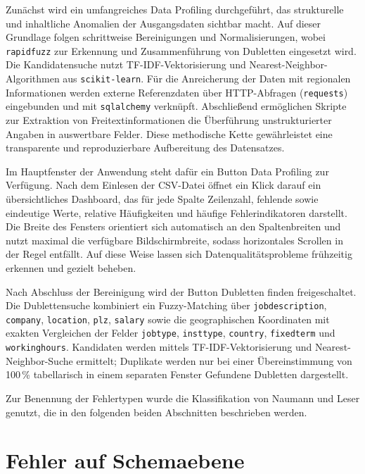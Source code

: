 \documentclass[
    a4paper,
    12pt,
    headinclude=true,
    BCOR=10mm,
]{scrreprt}
\begin{document}
Zunächst wird ein umfangreiches Data Profiling durchgeführt, das strukturelle und inhaltliche Anomalien der Ausgangsdaten sichtbar macht. Auf dieser Grundlage folgen schrittweise Bereinigungen und Normalisierungen, wobei \texttt{rapidfuzz} zur Erkennung und Zusammenführung von Dubletten eingesetzt wird. Die Kandidatensuche nutzt TF-IDF-Vektorisierung und Nearest-Neighbor-Algorithmen aus \texttt{scikit-learn}. Für die Anreicherung der Daten mit regionalen Informationen werden externe Referenzdaten über HTTP-Abfragen (\texttt{requests}) eingebunden und mit \texttt{sqlalchemy} verknüpft. Abschließend ermöglichen Skripte zur Extraktion von Freitextinformationen die Überführung unstrukturierter Angaben in auswertbare Felder. Diese methodische Kette gewährleistet eine transparente und reproduzierbare Aufbereitung des Datensatzes.

Im Hauptfenster der Anwendung steht dafür ein Button \glqq Data Profiling\grqq{} zur Verfügung. Nach dem Einlesen der CSV-Datei öffnet ein Klick darauf ein übersichtliches Dashboard, das für jede Spalte Zeilenzahl, fehlende sowie eindeutige Werte, relative Häufigkeiten und häufige Fehlerindikatoren darstellt. Die Breite des Fensters orientiert sich automatisch an den Spaltenbreiten und nutzt maximal die verfügbare Bildschirmbreite, sodass horizontales Scrollen in der Regel entfällt. Auf diese Weise lassen sich Datenqualitätsprobleme frühzeitig erkennen und gezielt beheben.

Nach Abschluss der Bereinigung wird der Button \glqq Dubletten finden\grqq{} freigeschaltet. Die Dublettensuche kombiniert ein Fuzzy-Matching über \texttt{jobdescription}, \texttt{company}, \texttt{location}, \texttt{plz}, \texttt{salary} sowie die geographischen Koordinaten mit exakten Vergleichen der Felder \texttt{jobtype}, \texttt{insttype}, \texttt{country}, \texttt{fixedterm} und \texttt{workinghours}. Kandidaten werden mittels TF-IDF-Vektorisierung und Nearest-Neighbor-Suche ermittelt; Duplikate werden nur bei einer Übereinstimmung von 100\,\% tabellarisch in einem separaten Fenster \glqq Gefundene Dubletten\grqq{} dargestellt.

Zur Benennung der Fehlertypen wurde die Klassifikation von Naumann und Leser genutzt, die in den folgenden beiden Abschnitten beschrieben werden.

\section{Fehler auf Schemaebene}
\end{document}
